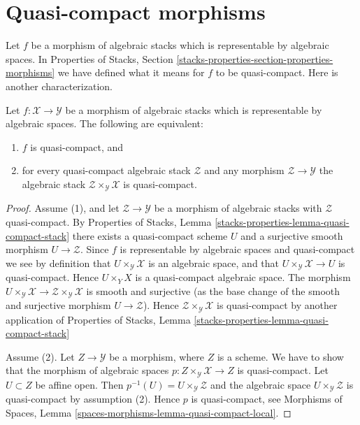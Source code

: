 \section{Quasi-compact morphisms}
\label{section-quasi-compact}

\noindent
Let $f$ be a morphism of algebraic stacks which is representable by
algebraic spaces. In
Properties of Stacks, Section
\ref{stacks-properties-section-properties-morphisms}
we have defined what it means for $f$ to be quasi-compact.
Here is another characterization.

\begin{lemma}
\label{lemma-characterize-representable-quasi-compact}
Let $f : \mathcal{X} \to \mathcal{Y}$ be a morphism of algebraic stacks
which is representable by algebraic spaces. The following are equivalent:
\begin{enumerate}
\item $f$ is quasi-compact, and
\item for every quasi-compact algebraic stack $\mathcal{Z}$
and any morphism $\mathcal{Z} \to \mathcal{Y}$ the algebraic stack
$\mathcal{Z} \times_\mathcal{Y} \mathcal{X}$ is quasi-compact.
\end{enumerate}
\end{lemma}

\begin{proof}
Assume (1), and let $\mathcal{Z} \to \mathcal{Y}$
be a morphism of algebraic stacks with $\mathcal{Z}$ quasi-compact. By
Properties of Stacks,
Lemma \ref{stacks-properties-lemma-quasi-compact-stack}
there exists a quasi-compact scheme $U$ and a surjective smooth
morphism $U \to \mathcal{Z}$. Since $f$ is representable by algebraic
spaces and quasi-compact we see by definition that
$U \times_\mathcal{Y} \mathcal{X}$ is an algebraic space, and that
$U \times_\mathcal{Y} \mathcal{X} \to U$ is quasi-compact.
Hence $U \times_Y X$ is a quasi-compact algebraic space.
The morphism
$U \times_\mathcal{Y} \mathcal{X} \to
\mathcal{Z} \times_\mathcal{Y} \mathcal{X}$
is smooth and surjective (as the base change of the smooth
and surjective morphism $U \to \mathcal{Z}$).
Hence $\mathcal{Z} \times_\mathcal{Y} \mathcal{X}$
is quasi-compact by another application of
Properties of Stacks,
Lemma \ref{stacks-properties-lemma-quasi-compact-stack}

\medskip\noindent
Assume (2). Let $Z \to \mathcal{Y}$ be a morphism, where $Z$ is a scheme.
We have to show that the morphism of algebraic spaces
$p : Z \times_\mathcal{Y} \mathcal{X} \to Z$ is quasi-compact.
Let $U \subset Z$ be affine open. Then
$p^{-1}(U) = U \times_\mathcal{Y} \mathcal{Z}$
and the algebraic space $U \times_\mathcal{Y} \mathcal{Z}$
is quasi-compact by assumption (2). Hence $p$ is quasi-compact, see
Morphisms of Spaces, Lemma \ref{spaces-morphisms-lemma-quasi-compact-local}.
\end{proof}


